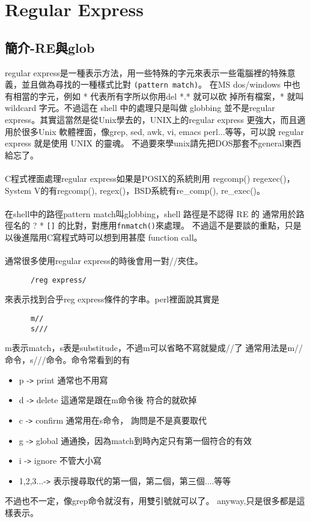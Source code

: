 \chapter{Regular Express}
    \section{簡介-RE與glob}
    regular express是一種表示方法，用一些特殊的字元來表示一些電腦裡的特殊意
    義，並且做為尋找的一種樣式比對 \verb=(pattern match)=。
    在MS dos/windows 中也有相當的字元，例如 * 代表所有字所以你用del *.* 就可以砍
    掉所有檔案，* 就叫 wildcard 字元。不過這在 shell 中的處理只是叫做 globbing
    並不是regular express。其實這當然是從Unix學去的，UNIX上的regular 
    express 更強大，而且適用於很多Unix 軟體裡面，像grep, sed, awk, vi, emacs
    perl...等等，可以說 regular express 就是使用 UNIX 的靈魂。
    不過要來學unix請先把DOS那套不general東西給忘了。
    \\\\
    C程式裡面處理regular express如果是POSIX的系統則用 regcomp() regexec()， 
    System V的有regcomp(), regex()，BSD系統有re\_comp(), re\_exec()。
    \\\\
    在shell中的路徑pattern match叫globbing，shell 路徑是不認得 RE 的
    通常用於路徑名的 ? * \verb=[]= 的比對，對應用\verb=fnmatch()=來處理。
    不過這不是要談的重點，只是以後進階用C寫程式時可以想到用甚麼 function call。
    \\\\
    通常很多使用regular express的時後會用一對//夾住。
    \begin{verbatim}
      /reg express/
    \end{verbatim}
    來表示找到合乎reg express條件的字串。perl裡面說其實是
    \begin{verbatim}
      m//
      s///
    \end{verbatim}
    m表示match，s表是substitude，不過m可以省略不寫就變成//了
    通常用法是m//命令，s///命令。命令常看到的有
    \begin{itemize}
    \item p       -\verb=>= print   通常也不用寫
    \item d       -\verb=>= delete  這通常是跟在m命令後  符合的就砍掉
    \item c       -\verb=>= confirm 通常用在s命令， 詢問是不是真要取代
    \item g       -\verb=>= global  通通換，因為match到時內定只有第一個符合的有效
    \item i       -\verb=>= ignore  不管大小寫
    \item 1,2,3...-\verb=>= 表示搜尋取代的第一個，第二個，第三個....等等
    \end{itemize}
    不過也不一定，像grep命令就沒有，用雙引號就可以了。
    anyway,只是很多都是這樣表示。
